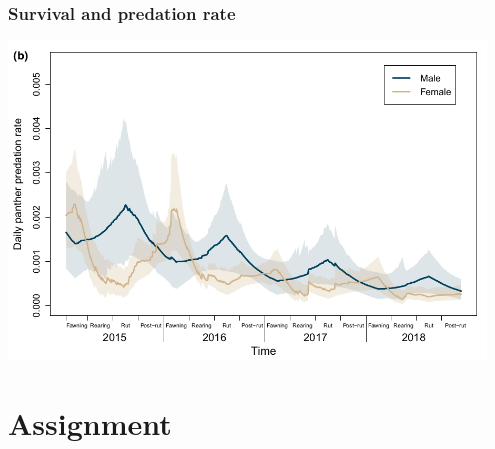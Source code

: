 \documentclass[color=usenames,dvipsnames]{beamer}
\begin{document}
\begin{frame}
  \frametitle{Survival and predation rate}
  \centering
  \includegraphics[width=0.95\textwidth]{figs/deer-pred-time} \\
\end{frame}



\section{Assignment}
\end{document}
